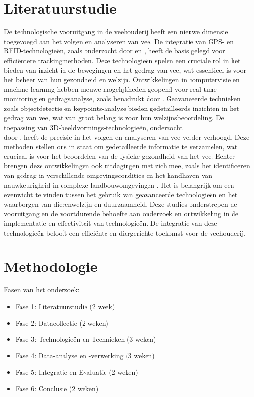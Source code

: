 \section{Literatuurstudie}%
\label{sec:state-of-the-art}
De technologische vooruitgang in de veehouderij heeft een nieuwe dimensie toegevoegd aan het volgen en analyseren van vee. 
De integratie van GPS- en RFID-technologieën, zoals onderzocht door \cite{Nääs2013} en \cite{Akhigbe2021}, heeft de basis gelegd voor efficiëntere trackingmethoden. 
Deze technologieën spelen een cruciale rol in het bieden van inzicht in de bewegingen en het gedrag van vee, wat essentieel is voor het beheer van hun gezondheid en welzijn.
Ontwikkelingen in computervisie en machine learning hebben nieuwe mogelijkheden geopend voor real-time monitoring en gedragsanalyse, zoals benadrukt door \cite{Kleanthous2018}. 
Geavanceerde technieken zoals objectdetectie en keypoints-analyse bieden gedetailleerde inzichten in het gedrag van vee, wat van groot belang is voor hun welzijnsbeoordeling. 
De toepassing van 3D-beeldvormings-technologieën, onderzocht \\door \cite{LeCozler2019}, heeft de precisie in het volgen en analyseren van vee verder verhoogd.
Deze methoden stellen ons in staat om gedetailleerde informatie te verzamelen, wat cruciaal is voor het beoordelen van de fysieke gezondheid van het vee.
Echter brengen deze ontwikkelingen ook uitdagingen met zich mee, zoals het identificeren van gedrag in verschillende omgevingscondities en het handhaven van nauwkeurigheid in complexe landbouwomgevingen \autocite{Narayan2023}\autocite{Busse2015}. 
Het is belangrijk om een evenwicht te vinden tussen het gebruik van geavanceerde technologieën en het waarborgen van dierenwelzijn en duurzaamheid.
Deze studies onderstrepen de vooruitgang en de voortdurende behoefte aan onderzoek en ontwikkeling in de implementatie en effectiviteit van technologieën. 
De integratie van deze technologieën belooft een efficiënte en diergerichte toekomst voor de veehouderij.
\section{Methodologie}%
\label{sec:methodologie}
Fasen van het onderzoek:
\begin{itemize}
  \item Fase 1: Literatuurstudie (2 week)
  \item Fase 2: Datacollectie (2 weken)
  \item Fase 3: Technologieën en Technieken (3 weken)
  \item Fase 4: Data-analyse en -verwerking (3 weken)
  \item Fase 5: Integratie en Evaluatie (2 weken)
  \item Fase 6: Conclusie (2 weken)
\end{itemize}
